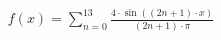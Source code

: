 \documentclass[preview]{standalone}
\begin{document}
\begin{align*}
f(x) = \sum_{n=0}^{13} \frac{4 \cdot \sin ((2n + 1) \cdot x) }{ (2n + 1) \cdot \pi}
\end{align*}
\end{document}
